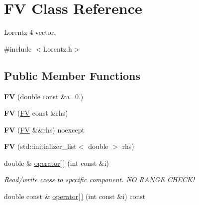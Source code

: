 \hypertarget{classFV}{}\section{F\+V Class Reference}
\label{classFV}


Lorentz 4-\/vector.  




{\ttfamily \#include $<$Lorentz.\+h$>$}

\subsection*{Public Member Functions}
\begin{DoxyCompactItemize}
\item 
\hypertarget{classFV_a9b4fbb099348e0f5658290d99fcfde0f}{}{\bfseries F\+V} (double const \&a=0.)\label{classFV_a9b4fbb099348e0f5658290d99fcfde0f}

\item 
\hypertarget{classFV_a7806dbe1498cda6e7b5e9deb0772915d}{}{\bfseries F\+V} (\hyperlink{classFV}{F\+V} const \&rhs)\label{classFV_a7806dbe1498cda6e7b5e9deb0772915d}

\item 
\hypertarget{classFV_a64d4ea0c4b74dd2fd557c72c30987aa5}{}{\bfseries F\+V} (\hyperlink{classFV}{F\+V} \&\&rhs) noexcept\label{classFV_a64d4ea0c4b74dd2fd557c72c30987aa5}

\item 
\hypertarget{classFV_aae9c72a65282efeadacc1b2be82b8b29}{}{\bfseries F\+V} (std\+::initializer\+\_\+list$<$ double $>$ rhs)\label{classFV_aae9c72a65282efeadacc1b2be82b8b29}

\item 
\hypertarget{classFV_addb4bbcc8d3ba7d8e94c1b6fdd006acd}{}double \& \hyperlink{classFV_addb4bbcc8d3ba7d8e94c1b6fdd006acd}{operator\mbox{[}$\,$\mbox{]}} (int const \&i)\label{classFV_addb4bbcc8d3ba7d8e94c1b6fdd006acd}

\begin{DoxyCompactList}\small\item\em Read/write ccess to specific component. N\+O R\+A\+N\+G\+E C\+H\+E\+C\+K! \end{DoxyCompactList}\item 
\hypertarget{classFV_a8c340629f03c5f4d96aefd119dd43d6e}{}double const \& \hyperlink{classFV_a8c340629f03c5f4d96aefd119dd43d6e}{operator\mbox{[}$\,$\mbox{]}} (int const \&i) const \label{classFV_a8c340629f03c5f4d96aefd119dd43d6e}


\end{DoxyCompactItemize}
